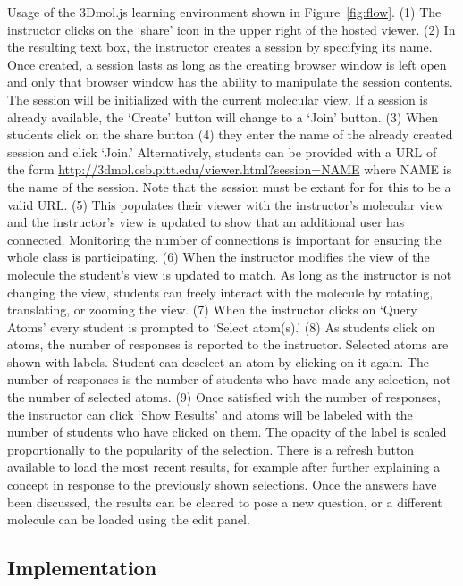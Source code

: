 \documentclass[journal=jceda8,manuscript=article]{achemso}
\begin{document}
Usage of the 3Dmol.js learning environment shown in Figure~\ref{fig:flow}.  (1) The instructor clicks on the `share' icon in the upper right of the hosted viewer. (2) In the resulting text box, the instructor creates a session by specifying its name.  Once created, a session lasts as long as the creating browser window is left open and only that browser window has the ability to manipulate the session contents.  The session will be initialized with the current molecular view. If a session is already available, the `Create' button will change to a `Join' button.  (3) When students click on the share button (4) they enter the name of the already created session and click `Join.'  Alternatively, students can be provided with a URL of the form \url{http://3dmol.csb.pitt.edu/viewer.html?session=NAME} where NAME is the name of the session.  Note that the session must be extant for for this to be a valid URL. (5) This populates their viewer with the instructor's molecular view and the instructor's view is updated to show that an additional user has connected.  Monitoring the number of connections is important for ensuring the whole class is participating.  (6) When the instructor modifies the view of the molecule the student's view is updated to match.  As long as the instructor is not changing the view, students can freely interact with the molecule by rotating, translating, or zooming the view. (7) When the instructor clicks on `Query Atoms' every student is prompted to `Select atom(s).'  (8) As students click on atoms, the number of responses is reported to the instructor.  Selected atoms are shown with labels.  Student can deselect an atom by clicking on it again.  The number of responses is the number of students who have made any selection, not the number of selected atoms. (9) Once satisfied with the number of responses, the instructor can click `Show Results' and atoms will be labeled with the number of students who have clicked on them.  The opacity of the label is scaled proportionally to the popularity of the selection.  There is a refresh button available to load the most recent results, for example after further explaining a concept in response to the previously shown selections.  Once the answers have been discussed, the results can be cleared to pose a new question, or a different molecule can be loaded using the edit panel.


\subsection{Implementation}
\end{document}

